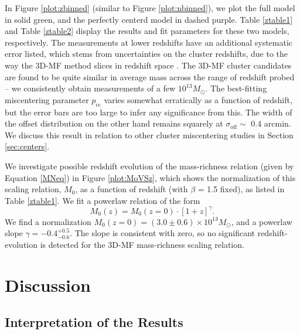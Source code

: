 In Figure \ref{plot:zbinned} (similar to Figure \ref{plot:nbinned}), we plot the full model in solid green, and the perfectly centerd model in dashed purple. Table \ref{ztable1} and Table \ref{ztable2} display the results and fit parameters for these two models, respectively. The measurements at lower redshifts have an additional systematic error listed, which stems from uncertainties on the cluster redshifts, due to the way the \ac{3D-MF} method slices in redshift space \citep{Ford14}. The \ac{3D-MF} cluster candidates are found to be quite similar in average mass across the range of redshift probed -- we consistently obtain measurements of a few $10^{13} M_{\odot}$. The best-fitting miscentering parameter $p_{\mathrm{cc}}$ varies somewhat erratically as a function of redshift, but the error bars are too large to infer any significance from this. The width of the offset distribution on the other hand remains squarely at $\sigma_{\mathrm{off}} \sim$ 0.4 arcmin. We discuss this result in relation to other cluster miscentering studies in Section \ref{sec:centers}.

We investigate possible redshift evolution of the mass-richness relation (given by Equation \ref{MNeq}) in Figure \ref{plot:MoVSz}, which shows the normalization of this scaling relation, $M_0$, as a function of redshift (with $\beta$ = 1.5 fixed), as listed in Table \ref{ztable1}. We fit a powerlaw relation of the form
\begin{equation}
\label{MoZeq}
M_0 (z) = M_0 (z=0) \cdot \left[ 1+z \right] ^{\gamma}.
\end{equation}
We find a normalization $M_0 (z=0) = (3.0 \pm 0.6) \times 10^{13} M_{\odot}$, and a powerlaw slope $\gamma = -0.4^{+0.5}_{-0.6}$. The slope is consistent with zero, so no significant redshift-evolution is detected for the \ac{3D-MF} mass-richness scaling relation.



\section{Discussion}
\label{ch4:disc}


\subsection{Interpretation of the Results}

